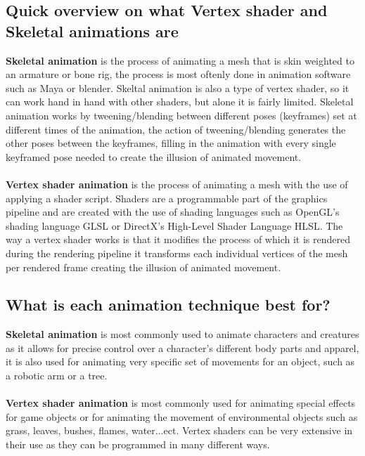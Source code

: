 \documentclass{scrartcl}
\begin{document}
\subsection{Quick overview on what Vertex shader and Skeletal animations are}
\textbf{Skeletal animation} is the process of animating a mesh that is skin weighted to an armature or bone rig, the process is most oftenly done in animation software such as Maya or blender.
Skeltal animation is also a type of vertex shader, so it can work hand in hand with other shaders, but alone it is fairly limited.\cite{ten}
Skeletal animation works by tweening/blending between different poses (keyframes) set at different times of the animation, the action of tweening/blending generates the other poses between the keyframes, filling in the animation with every single keyframed pose needed to create the illusion of animated movement.
\\~\\
\textbf{Vertex shader animation} is the process of animating a mesh with the use of applying a shader script. Shaders are a programmable part of the graphics pipeline and are created with the use of shading languages such as OpenGL's shading language GLSL or DirectX's High-Level Shader Language HLSL.\cite{twelve}
The way a vertex shader works is that it modifies the process of which it is rendered during the rendering pipeline it transforms each individual vertices of the mesh per rendered frame creating the illusion of animated movement.\cite{nine}

\subsection{What is each animation technique best for?}
\textbf{Skeletal animation} is most commonly used to animate characters and creatures as it allows for precise control over a character's different body parts and apparel, it is also used for animating very specific set of movements for an object, such as a robotic arm or a tree.\cite{ten}
\\~\\
\textbf{Vertex shader animation} is most commonly used for animating special effects for game objects or for animating the movement of environmental objects such as grass, leaves, bushes, flames, water...ect.\cite{two}\cite{three}\cite{four}\cite{six}
Vertex shaders can be very extensive in their use as they can be programmed in many different ways.
\end{document}
